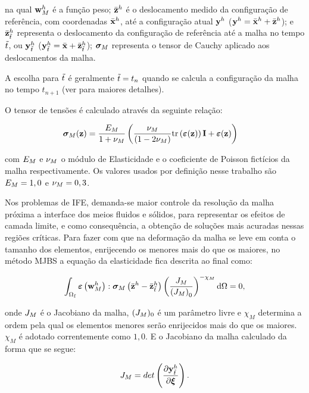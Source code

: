 \noindent na qual $\mathbf{w}_{M}^h$ é a função peso; $\bar{\mathbf{z}}^h$ é o deslocamento medido da configuração de referência, com coordenadas $\bar{\mathbf{x}}^h$, até a configuração atual $\mathbf{y}^h$ ($\mathbf{y}^h = \bar{\mathbf{x}}^h +\bar{\mathbf{z}}^h $); e 
$\bar{\mathbf{z}}_{\tilde{t}}^h$ representa o deslocamento da configuração de referência até a malha no tempo ${\tilde{t}}$, ou $\mathbf{y}^h_{\tilde{t}}$ ($\mathbf{y}^h_{\tilde{t}} = \bar{\mathbf{x}} + \bar{\mathbf{z}}_{\tilde{t}}^h$); $\boldsymbol{\sigma}_{M}$ representa o tensor de Cauchy aplicado aos deslocamentos da malha.

A escolha para $\tilde{t}$ é geralmente $\tilde{t} = {t_{n}}$ quando se calcula a configuração da malha no tempo ${t_{n+1}}$ (ver  para maiores detalhes). 

O tensor de tensões é calculado através da seguinte relação:

\begin{align}
	\boldsymbol{\sigma}_{M}(\mathbf{z})
	&=
	\frac{E_{M}}{1+\nu_{M}}
	\left(
	\frac{\nu_{M}}{(1 - 2 \nu_{M})}
	\mathrm{tr}\left(\bm{\varepsilon}(\mathbf{z})\right)\mathbf{I}
	+
	\bm{\varepsilon}(\mathbf{z})
	\right)
\end{align}

\noindent com $E_{M}$ e $\nu_{M}$ o módulo de Elasticidade e o coeficiente de Poisson fictícios da malha respectivamente. Os valores usados por definição nesse trabalho são $E_{M} =1,0$ e $\nu_{M} = 0,3$.

Nos problemas de IFE, demanda-se maior controle da resolução da malha próxima a interface dos meios fluidos e sólidos, para representar os efeitos de camada limite, e como consequência, a obtenção de soluções mais acuradas nessas regiões críticas. Para fazer com que na deformação da malha se leve em conta o tamanho dos elementos, enrijecendo os menores mais do que os maiores, no método MJBS a equação da elasticidade fica descrita ao final como:

\begin{align}
	\int_{\Omega_{\tilde{t}}} \bm{\varepsilon} \left(\mathbf{w}_{M}^h\right) : \boldsymbol{\sigma}_{M} \left(\bar{\mathbf{z}}^h- \bar{\mathbf{z}}_{\tilde{t}}^h\right) \left(\frac{J_{M}}{\left({J_{M}}\right)_0}\right)^{-\chi_M} \mathrm{d} \Omega = 0, 
	\label{eq:elasticityMJBS}
\end{align}

\noindent onde $J_{M}$ é o Jacobiano da malha, $(J_{M})_0$ é um parâmetro livre e $\chi_M$ determina a ordem pela qual os elementos menores serão enrijecidos mais do que os maiores.  $\chi_M$ é adotado correntemente como $1,0$. E o Jacobiano da malha calculado da forma que se segue:

\begin{align}
	J_{M} = det\left(\frac{\partial\mathbf{y}^h_{\tilde{t}}}{\partial\boldsymbol{\xi}}\right).
\end{align}

